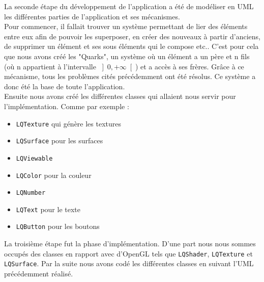 \documentclass{report}
\begin{document}
La seconde étape du développement de l'application a été de modéliser en UML les différentes parties de l'application et ses mécanismes. \\
Pour commencer, il fallait trouver un système permettant de lier des éléments entre eux afin de pouvoir les superposer, en créer des nouveaux à partir d'anciens, de supprimer un élément et ses sous éléments qui le compose etc..
C'est pour cela que nous avons créé les "Quarks", un système où un élément a un père et n fils (où n appartient à l'intervalle \(\left]0, +\infty\right[\)) et a accès à ses frères. Grâce à ce mécanisme, tous les problèmes cités précédemment ont été résolus. Ce système a donc été la base de toute l'application. \\
Ensuite nous avons créé les différentes classes qui allaient nous servir pour l'implémentation. Comme par exemple : 
\begin{itemize}[label=$-$]
    \item \verb!LQTexture! qui génère les textures
    \item \verb!LQSurface! pour les surfaces
    \item \verb!LQViewable! 
    \item \verb!LQColor! pour la couleur
    \item \verb!LQNumber! 
    \item \verb!LQText! pour le texte
    \item \verb!LQButton! pour les boutons 
\end{itemize}

La troisième étape fut la phase d'implémentation. D'une part nous nous sommes occupés des classes en rapport avec d'OpenGL tels que \verb!LQShader!, \verb!LQTexture! et \verb!LQSurface!.
Par la suite nous avons codé les différentes classes en suivant l'UML précédemment réalisé.
\end{document}
